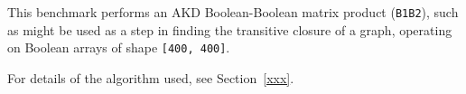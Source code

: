 This benchmark performs an AKD Boolean-Boolean matrix 
product ({\tt B1\qor\qdot\qand\0B2}),
such as might be used as a step in finding the transitive closure of
a graph, operating on Boolean arrays of shape {\tt [400, 400]}. 

For details of the algorithm used, see Section~\ref{xxx}.


